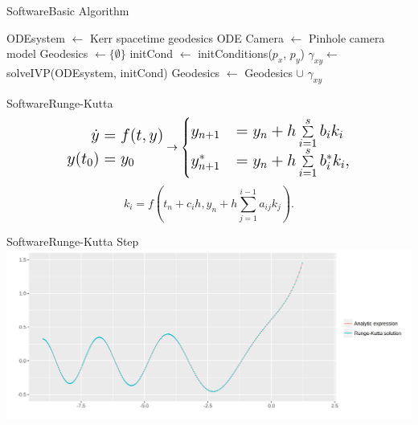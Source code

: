 


\begin{frame}{Software}{Basic Algorithm}
	{
	\tiny
	\begin{algorithm}[H]
		\begin{algorithmic}[1]
			\State ODEsystem $\gets$ Kerr spacetime geodesics ODE
			\State Camera $\gets$ Pinhole camera model
			\State Geodesics $\gets \{\emptyset\}$
			\State initCond $\gets$ initConditions($p_x$, $p_y$)
			\State $\gamma_{xy} \gets$ solveIVP(ODEsystem, initCond)
			\State Geodesics $\gets$ Geodesics $\cup$ $\gamma_{xy}$
			\EndFor
			\EndFunction
		\end{algorithmic}
	\end{algorithm}
	}
\end{frame}

\begin{frame}{Software}{Runge-Kutta}
	\[
	\Large
	\begin{split}
		\dot{y} &= f(t,y) \\
		y(t_0) &= y_0
	\end{split}
	\rightarrow
	\begin{cases}
		y_{n+1} &= y_n + h \sum\limits_{i=1}^s b_i k_i\\
		y^*_{n+1} &= y_n + h \sum\limits_{i=1}^s b^*_i k_i,
	\end{cases}
	\]
	\vspace{2mm}
	\[
		k_i = f(t_n + c_ih, y_n + h\sum_{j=1}^{i-1} a_{ij} k_j).
	\]
\end{frame}

\begin{frame}{Software}{Runge-Kutta Step}
	\centering
	\includegraphics[width=0.8\paperwidth]{gfx/analytic}
\end{frame}

